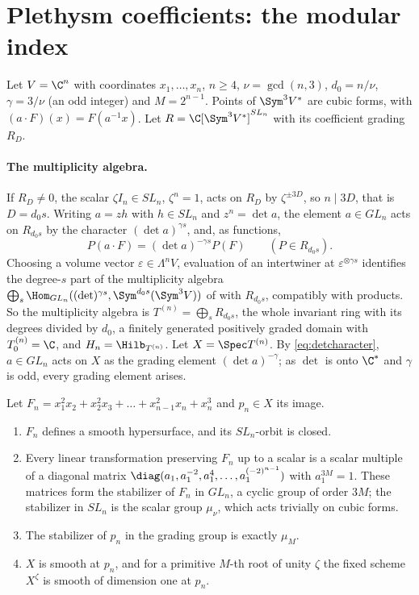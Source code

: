 \section{Plethysm coefficients: the modular index}\label{sec:plethysm}

Let $V=\C^n$ with coordinates $x_1,\dots,x_n$, $n\ge4$, $\nu=\gcd(n,3)$,
$d_0=n/\nu$, $\gamma=3/\nu$ (an odd integer) and $M=2^{n-1}$. Points of
$\Sym^3V^*$ are cubic forms, with $(a\cdot F)(x)=F(a^{-1}x)$. Let
$R=\C[\Sym^3V^*]^{SL_n}$ with its coefficient grading $R_D$.

\paragraph{The multiplicity algebra.}
If $R_D\ne0$, the scalar $\zeta I_n\in SL_n$, $\zeta^n=1$, acts on $R_D$ by
$\zeta^{\pm3D}$, so $n\mid3D$, that is $D=d_0s$. Writing $a=zh$ with
$h\in SL_n$ and $z^n=\det a$, the element $a\in GL_n$ acts on $R_{d_0s}$ by the
character $(\det a)^{\gamma s}$, and, as functions,
\begin{equation}\label{eq:detcharacter}
 P(a\cdot F)=(\det a)^{-\gamma s}P(F)\qquad(P\in R_{d_0s}).
\end{equation}
Choosing a volume vector $\varepsilon\in\Lambda^nV$, evaluation of an
intertwiner at $\varepsilon^{\otimes\gamma s}$ identifies the degree-$s$ part
of the multiplicity algebra $\bigoplus_s\Hom_{GL_n}((\det)^{\gamma s},
\Sym^{d_0s}(\Sym^3V))$ of \cite[Section 4.1.2, eq.~(4.5)]{GCT6} with $R_{d_0s}$,
compatibly with products. So the multiplicity algebra is
$T^{(n)}=\bigoplus_sR_{d_0s}$, the whole invariant ring with its degrees
divided by $d_0$, a finitely generated positively graded domain with
$T^{(n)}_0=\C$, and $H_n=\Hilb_{T^{(n)}}$. Let $X=\Spec T^{(n)}$. By
\eqref{eq:detcharacter}, $a\in GL_n$ acts on $X$ as the grading element
$(\det a)^{-\gamma}$; as $\det$ is onto $\C^*$ and $\gamma$ is odd, every
grading element arises.

\begin{proposition}\label{prop:chaincubic}
Let $F_n=x_1^2x_2+x_2^2x_3+\dots+x_{n-1}^2x_n+x_n^3$ and $p_n\in X$ its image.
\begin{enumerate}
\item $F_n$ defines a smooth hypersurface, and its $SL_n$-orbit is closed.
\item Every linear transformation preserving $F_n$ up to a scalar is a scalar
multiple of a diagonal matrix $\diag(a_1,a_1^{-2},a_1^4,\dots,a_1^{(-2)^{n-1}})$
with $a_1^{3M}=1$. These matrices form the stabilizer of $F_n$ in $GL_n$, a
cyclic group of order $3M$; the stabilizer in $SL_n$ is the scalar group
$\mu_\nu$, which acts trivially on cubic forms.
\item The stabilizer of $p_n$ in the grading group is exactly $\mu_M$.
\item $X$ is smooth at $p_n$, and for a primitive $M$-th root of unity $\zeta$
the fixed scheme $X^\zeta$ is smooth of dimension one at $p_n$.
\end{enumerate}
\end{proposition}

